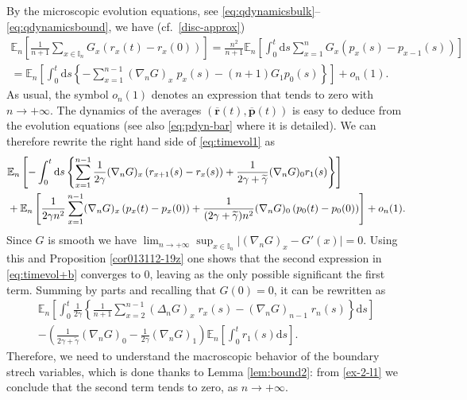 \documentclass[EJP]{ejpecp} %
\newcommand\bbE{{\mathbb E}}
\newcommand\T{{\mathbb I}}
\newcommand{\dd  }{\mathrm{d}}
\renewcommand{\tilde}{\widetilde}
\renewcommand{\bar}{\overline}
\numberwithin{equation}{section}
\begin{document}
By the microscopic evolution equations, see 
\eqref{eq:qdynamicsbulk}--\eqref{eq:qdynamicsbound}, we have  (cf.~\eqref{disc-approx})
\begin{multline}
 \bbE_n\left[  \frac{1}{n+1}\sum_{x\in\T_n}
    G_x\left(r_x(t) -  r_x(0)\right) \right] 
    = \frac{n^2}{n+1}\bbE_n\left[ \int_0^t \dd s  \sum_{x=1}^n 
   G_x \left(p_x(s) -  p_{x-1}(s)\right) \right] \\
 = \bbE_n\left[  \int_0^t \dd s \left\{ -\sum_{x=1}^{n-1} 
    (\nabla_n G)_x\;p_x(s) - (n+1)
    G_1 p_0(s)\right\}\right]+o_n(1).
  \label{eq:timevol1} \end{multline}
As usual, the symbol $o_n(1)$ denotes an expression that {tends to zero} with $n\to+\infty$.  The dynamics of the averages $(\bar{\mathbf{r}}(t),\bar{\mathbf{p}}(t))$ is easy to deduce from the evolution equations (see also 
\eqref{eq:pdyn-bar} where it is detailed). We can therefore rewrite the right hand side of \eqref{eq:timevol1} as
\begin{align}
  &
 \bbE_n\left[ -\int_0^t  \dd s  \left\{ \sum_{x=1}^{n-1} \frac{1}{2\gamma} (\nabla_n
      G)_x\left(r_{x+1}(s) - r_x(s)\right) +\frac {1}{2\gamma+ \tilde\gamma} (\nabla_n
      G)_0 r_1(s) \right\}\right] \label{eq:timevol+b} %
\\
&+\bbE_n\left[ \frac{1}{2\gamma n^2} \sum_{x=1}^{n-1} (\nabla_n
      G)_x\left(p_x(t) - p_x(0)\right) + \frac
      {1}{(2\gamma +\tilde \gamma)n^2}   
     (\nabla_n
      G)_0\left(p_0(t) - p_0(0)\right) \right]  +o_n(1).  \notag
\end{align}
Since $G$ is smooth we have $
\lim_{n\to+\infty}\sup_{x\in \T_n}\big|(\nabla_nG)_x- G'(x)\big|=0.
$
Using this and Proposition \ref{cor013112-19z} one shows that the
second expression in
\eqref{eq:timevol+b} converges to $0$,
leaving as the only possible significant the first term. 
Summing by parts and recalling  that $G(0)=0$, it can be rewritten as
\begin{multline}\label{eq:timevol3}
\bbE_n\left[ \int_0^t  \frac{1}{2\gamma}\left\{\frac{1}{n+1} \sum_{x=2}^{n-1}
      (\Delta_n G)_x\; r_x(s) - (\nabla_n G)_{n-1}\; r_n(s) \right\} \dd s\right]\\
      - \left(\frac {1}{2\gamma+ \tilde\gamma}  
      (\nabla_n G)_0 -\frac{1}{2\gamma}  (\nabla_n G)_1 \right)
   \bbE_n\left[\int_0^t r_1(s) \dd s\right].    
\end{multline}
Therefore, we need to understand the macroscopic behavior of the boundary strech variables, which is done thanks to Lemma \ref{lem:bound2}: from \eqref{ex-2-l1} we conclude that the second term {tends to zero}, as $n\to+\infty$.
\end{document}
